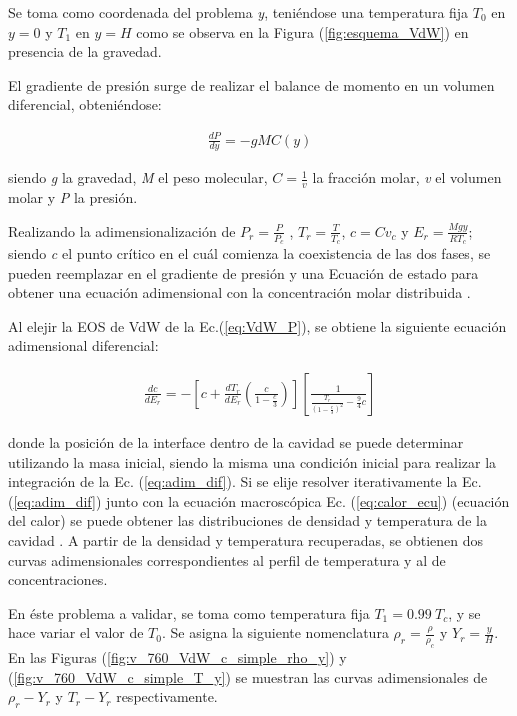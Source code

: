 Se toma como coordenada del problema \textit{y}, teniéndose una temperatura fija $T_{0}$ en $y = 0$ y $T_{1}$ en $y = H$ como se observa en la Figura (\ref{fig:esquema_VdW}) en presencia de la gravedad.

El gradiente de presión surge de realizar el balance de momento en un volumen diferencial, obteniéndose:

\begin{align}
	\frac{d P}{d y} = - g M C(y)
\end{align}

siendo \textit{g} la gravedad, \textit{M} el peso molecular, $C = \frac{1}{v}$ la fracción molar, \textit{v} el volumen molar y \textit{P} la presión.

Realizando la adimensionalización de $ P_r = \frac{P}{P_c}$ , $ T_r = \frac{T}{T_c}$, $c = C v_c$ y $E_r = \frac{M g y}{R T_c}$; siendo \textit{c} el punto crítico en el cuál comienza la coexistencia de las dos fases, se pueden reemplazar en el gradiente de presión y una Ecuación de estado para obtener una ecuación adimensional con la concentración molar distribuida \cite{fogliatto2019simulation}.



Al elejir la EOS de VdW de la Ec.(\ref{eq:VdW_P}), se obtiene la siguiente ecuación adimensional diferencial:

\begin{align}
	\frac{d c}{d E_r} = - \left[ c + \frac{d T_r}{d E_r} \left( \frac{c}{1 - \frac{c}{3}}\right) \right] \left[	\frac{1}{\frac{T_r}{{\left(1- \frac{c}{3}\right)}^2} - \frac{9}{4} c}  \right] 
	\label{eq:adim_dif}
\end{align} 

donde la posición de la interface dentro de la cavidad se puede determinar utilizando la masa inicial, siendo la misma una condición inicial para realizar la integración de la Ec. (\ref{eq:adim_dif}). Si se elije  resolver iterativamente la Ec. (\ref{eq:adim_dif}) junto con la ecuación macroscópica Ec. (\ref{eq:calor_ecu}) (ecuación del calor) se puede obtener las distribuciones de densidad y temperatura de la cavidad \cite{fogliatto2019simulation}. A partir de la densidad y temperatura recuperadas, se obtienen dos curvas adimensionales correspondientes al perfil de temperatura y al de concentraciones. 

En éste problema a validar, se toma como temperatura fija $T_1 = 0.99 \> T_c$, y se hace variar el valor de  $T_0$. Se asigna la siguiente nomenclatura $\rho_r = \frac{\rho}{\rho_c}$ y  $Y_r = \frac{y}{H}$. En las Figuras (\ref{fig:v_760_VdW_c_simple_rho_y}) y (\ref{fig:v_760_VdW_c_simple_T_y}) se muestran las curvas adimensionales de $ \rho_r - Y_r $ y $ T_r - Y_r $ respectivamente.

